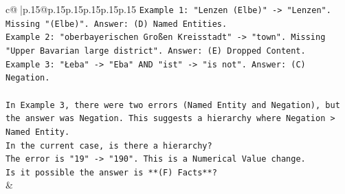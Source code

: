 \documentclass{article}
\begin{document}
{\begin{supertabular}{c@{$\;$}|p{.15\linewidth}@{}p{.15\linewidth}p{.15\linewidth}p{.15\linewidth}p{.15\linewidth}p{.15\linewidth}}
{{{\texttt{Example 1: "Lenzen (Elbe)" {-}> "Lenzen". Missing "(Elbe)". Answer: (D) Named Entities.} \\
\texttt{Example 2: "oberbayerischen Großen Kreisstadt" {-}> "town". Missing "Upper Bavarian large district". Answer: (E) Dropped Content.} \\
\texttt{Example 3: "Łeba" {-}> "Eba" AND "ist" {-}> "is not". Answer: (C) Negation.} \\
\\ 
\texttt{In Example 3, there were two errors (Named Entity and Negation), but the answer was Negation. This suggests a hierarchy where Negation > Named Entity.} \\
\texttt{In the current case, is there a hierarchy?} \\
\texttt{The error is "19" {-}> "190". This is a Numerical Value change.} \\
\texttt{Is it possible the answer is **(F) Facts**?} \\
            }
        }
    }
    & \\ \\

\end{supertabular}
}
\end{document}
